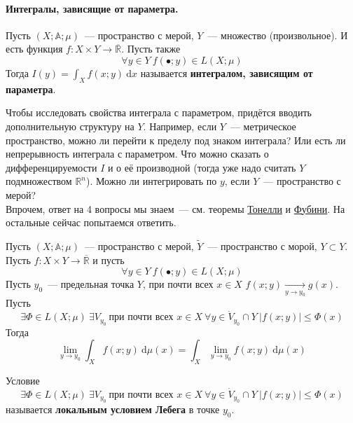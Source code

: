 \documentclass{article}
\begin{document}
    \paragraph{Интегралы, зависящие от параметра.}
    \begin{definition}
        Пусть $(X;\mathbb A;\mu)$~--- пространство с мерой, $Y$~--- множество (произвольное). И есть функция $f\colon X\times Y\to\overline{\mathbb R}$. Пусть также
        $$\forall y\in Y~f(\bullet;y)\in L(X;\mu)$$
        Тогда $I(y)=\int_Xf(x;y)~\mathrm dx$ называется \textbf{интегралом, зависящим от параметра}.
    \end{definition}
    \begin{remark}
        Чтобы исследовать свойства интеграла с параметром, придётся вводить дополнительную структуру на $Y$. Например, если $Y$~--- метрическое пространство, можно ли перейти к пределу под знаком интеграла? Или есть ли непрерывность интеграла с параметром. Что можно сказать о дифференцируемости $I$ и о её производной (тогда уже надо считать $Y$ подмножеством $\mathbb R^n$). Можно ли интегрировать по $y$, если $Y$~--- пространство с мерой?\\
        Впрочем, ответ на 4 вопросы мы знаем~--- см. теоремы \hyperref[Теорема Тонелли]{Тонелли} и \hyperref[Теорема Фубини]{Фубини}. На остальные сейчас попытаемся ответить.
    \end{remark}
    \begin{theorem}
        \label{Предельный переход по параметру под знаком интеграла}
        Пусть $(X;\mathbb A;\mu)$~--- пространство с мерой, $\tilde Y$~--- пространство с морой, $Y\subset Y$. Пусть $f\colon X\times Y\to\overline{\mathbb R}$ и пусть
        $$\forall y\in Y~f(\bullet;y)\in L(X;\mu)$$
        Пусть $y_0$~--- предельная точка $Y$, при почти всех $x\in X$ $f(x;y)\underset{y\to y_0}\rightarrow g(x)$.\\
        Пусть
        $$\exists\Phi\in L(X;\mu)~\exists V_{y_0}~\text{при почти всех }x\in X~\forall y\in{\dot V}_{y_0}\cap Y~|f(x;y)|\leqslant\Phi(x)$$
        Тогда
        $$
        \lim\limits_{y\to y_0}\int_Xf(x;y)~\mathrm d\mu(x)=\int_X\lim\limits_{y\to y_0}f(x;y)~\mathrm d\mu(x)
        $$
    \end{theorem}
    \begin{definition}
        Условие
        $$\exists\Phi\in L(X;\mu)~\exists V_{y_0}~\text{при почти всех }x\in X~\forall y\in{\dot V}_{y_0}\cap Y~|f(x;y)|\leqslant\Phi(x)$$
        называется \textbf{локальным условием Лебега} в точке $y_0$.
    \end{definition}
\end{document}
